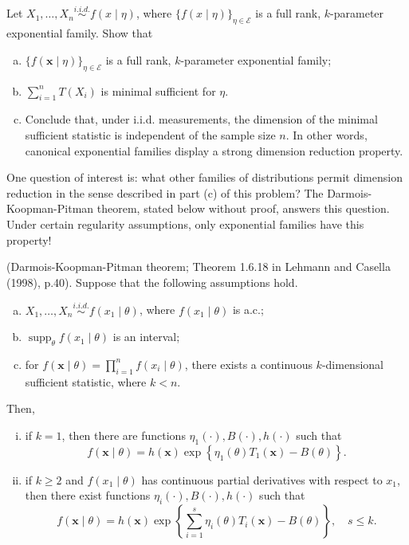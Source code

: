 \chapter{}

\begin{ex}
    Let \(X_{1}, \ldots, X_{n} \stackrel{i.i.d.}{\sim} f(x \mid \eta)\), where \(\{f(x \mid \eta)\}_{\eta \in \mathcal{E}}\) is a full rank, \(k\)-parameter exponential family. Show that
    \begin{enumerate}[(a)]
        \item \(\{f(\mathbf{x} \mid \eta)\}_{\eta \in \mathcal{E}}\) is a full rank, \(k\)-parameter exponential family; 
        \item \(\sum_{i=1}^{n} T\left(X_{i}\right)\) is minimal sufficient for \(\eta\). 
        \item Conclude that, under i.i.d. measurements, the dimension of the minimal sufficient statistic is independent of the sample size \(n\). In other words, canonical exponential families display a strong dimension reduction property. 
    \end{enumerate}
     One question of interest is: what other families of distributions permit dimension reduction in the sense described in part (c) of this problem? The Darmois-Koopman-Pitman theorem, stated below without proof, answers this question. Under certain regularity assumptions, only exponential families have this property!
    
     (Darmois-Koopman-Pitman theorem; Theorem 1.6.18 in Lehmann and Casella (1998), p.40). Suppose that the following assumptions hold.
    \begin{enumerate}[(a)]
        \item \(X_{1}, \ldots, X_{n} \stackrel{i.i.d. }{\sim} f\left(x_{1} \mid \theta\right)\), where \(f\left(x_{1} \mid \theta\right)\) is a.c.; 
        \item \(\operatorname{supp}_{\theta} f\left(x_{1} \mid \theta\right)\) is an interval; 
        \item for \(f(\boldsymbol{x} \mid \theta)=\prod_{i=1}^{n} f\left(x_{i} \mid \theta\right)\), there exists a continuous \(k\)-dimensional sufficient statistic, where \(k<n\). 
    \end{enumerate}
    Then,
    \begin{enumerate}[(i)]
        \item if \(k=1\), then there are functions \(\eta_{1}(\cdot), B(\cdot), h(\cdot)\) such that
        \[
        f(\boldsymbol{x} \mid \theta)=h(\boldsymbol{x}) \exp \left\{\eta_{1}(\theta) T_{1}(\boldsymbol{x})-B(\theta)\right\}. 
        \]
        \item if \(k \geq 2\) and \(f\left(x_{1} \mid \theta\right)\) has continuous partial derivatives with respect to \(x_{1}\), then there exist functions \(\eta_{i}(\cdot), B(\cdot), h(\cdot)\) such that
        \[
        f(\boldsymbol{x} \mid \theta)=h(\boldsymbol{x}) \exp \left\{\sum_{i=1}^{s} \eta_{i}(\theta) T_{i}(\boldsymbol{x})-B(\theta)\right\}, \quad s \leq k .
        \]
    \end{enumerate}
\end{ex}

